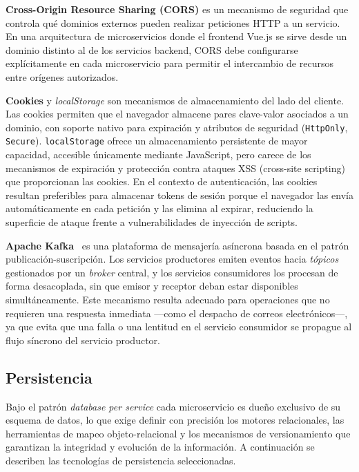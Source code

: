 \textbf{Cross-Origin Resource Sharing (CORS)} es un mecanismo de seguridad que controla qu\'{e} dominios externos pueden realizar peticiones HTTP a un servicio. En una arquitectura de microservicios donde el frontend Vue.js se sirve desde un dominio distinto al de los servicios backend, CORS debe configurarse expl\'{i}citamente en cada microservicio para permitir el intercambio de recursos entre or\'{i}genes autorizados.

\textbf{Cookies} y \textit{localStorage} son mecanismos de almacenamiento del lado del cliente. Las cookies permiten que el navegador almacene pares clave-valor asociados a un dominio, con soporte nativo para expiraci\'{o}n y atributos de seguridad (\texttt{HttpOnly}, \texttt{Secure}). \texttt{localStorage} ofrece un almacenamiento persistente de mayor capacidad, accesible \'{u}nicamente mediante JavaScript, pero carece de los mecanismos de expiraci\'{o}n y protecci\'{o}n contra ataques XSS (cross-site scripting) que proporcionan las cookies. En el contexto de autenticaci\'{o}n, las cookies resultan preferibles para almacenar tokens de sesi\'{o}n porque el navegador las env\'{i}a autom\'{a}ticamente en cada petici\'{o}n y las elimina al expirar, reduciendo la superficie de ataque frente a vulnerabilidades de inyecci\'{o}n de scripts.

\textbf{Apache Kafka}~\cite{kafka2024} es una plataforma de mensajer\'{i}a as\'{i}ncrona basada en el patr\'{o}n publicaci\'{o}n-suscripci\'{o}n. Los servicios productores emiten eventos hacia \textit{t\'{o}picos} gestionados por un \textit{broker} central, y los servicios consumidores los procesan de forma desacoplada, sin que emisor y receptor deban estar disponibles simult\'{a}neamente. Este mecanismo resulta adecuado para operaciones que no requieren una respuesta inmediata ---como el despacho de correos electr\'{o}nicos---, ya que evita que una falla o una lentitud en el servicio consumidor se propague al flujo s\'{i}ncrono del servicio productor.

\subsection{Persistencia}

Bajo el patr\'{o}n \textit{database per service} cada microservicio es due\~{n}o exclusivo de su esquema de datos, lo que exige definir con precisi\'{o}n los motores relacionales, las herramientas de mapeo objeto-relacional y los mecanismos de versionamiento que garantizan la integridad y evoluci\'{o}n de la informaci\'{o}n. A continuaci\'{o}n se describen las tecnolog\'{i}as de persistencia seleccionadas.

